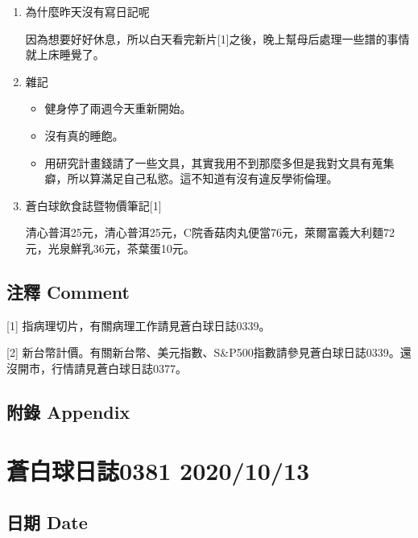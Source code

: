 \documentclass[a5paper, 11pt
]{book}
\providecommand{\tightlist}{%
  \setlength{\itemsep}{0pt}\setlength{\parskip}{0pt}}
\begin{document}
\begin{enumerate}
\def\labelenumi{\arabic{enumi}.}
\item
  為什麼昨天沒有寫日記呢

  因為想要好好休息，所以白天看完新片{[}1{]}之後，晚上幫母后處理一些譜的事情就上床睡覺了。
\item
  雜記

  \begin{itemize}
  \tightlist
  \item
    健身停了兩週今天重新開始。
  \item
    沒有真的睡飽。
  \item
    用研究計畫錢請了一些文具，其實我用不到那麼多但是我對文具有蒐集癖，所以算滿足自己私慾。這不知道有沒有違反學術倫理。
  \end{itemize}
\item
  蒼白球飲食誌暨物價筆記{[}1{]}

  清心普洱25元，清心普洱25元，C院香菇肉丸便當76元，萊爾富義大利麵72元，光泉鮮乳36元，茶葉蛋10元。
\end{enumerate}

\hypertarget{ux6ce8ux91cb-comment-38}{%
\subsection{注釋 Comment}\label{ux6ce8ux91cb-comment-38}}

{[}1{]} 指病理切片，有關病理工作請見蒼白球日誌0339。

{[}2{]}
新台幣計價。有關新台幣、美元指數、S\&P500指數請參見蒼白球日誌0339。還沒開市，行情請見蒼白球日誌0377。

\hypertarget{ux9644ux9304-appendix-38}{%
\subsection{附錄 Appendix}\label{ux9644ux9304-appendix-38}}

\hypertarget{ux84bcux767dux7403ux65e5ux8a8c0381-20201013}{%
\section{蒼白球日誌0381
2020/10/13}\label{ux84bcux767dux7403ux65e5ux8a8c0381-20201013}}

\hypertarget{ux65e5ux671f-date-39}{%
\subsection{日期 Date}\label{ux65e5ux671f-date-39}}
\end{document}
